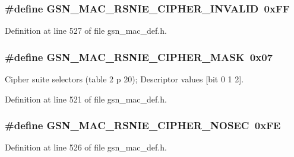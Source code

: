 \hypertarget{a00642_ga6498ff5acf21d809adebf490aaeb1158}{
\subsubsection[{GSN\_\-MAC\_\-RSNIE\_\-CIPHER\_\-INVALID}]{\setlength{\rightskip}{0pt plus 5cm}\#define GSN\_\-MAC\_\-RSNIE\_\-CIPHER\_\-INVALID~0xFF}}
\label{a00642_ga6498ff5acf21d809adebf490aaeb1158}


Definition at line 527 of file gsn\_\-mac\_\-def.h.

\hypertarget{a00642_ga9f1db3741ca60ee70690fe908f615b05}{
\subsubsection[{GSN\_\-MAC\_\-RSNIE\_\-CIPHER\_\-MASK}]{\setlength{\rightskip}{0pt plus 5cm}\#define GSN\_\-MAC\_\-RSNIE\_\-CIPHER\_\-MASK~0x07}}
\label{a00642_ga9f1db3741ca60ee70690fe908f615b05}


Cipher suite selectors (table 2 p 20); Descriptor values \mbox{[}bit 0 1 2\mbox{]}. 



Definition at line 521 of file gsn\_\-mac\_\-def.h.

\hypertarget{a00642_ga29ef5d37177a52a22dd6707dd3e943cf}{
\subsubsection[{GSN\_\-MAC\_\-RSNIE\_\-CIPHER\_\-NOSEC}]{\setlength{\rightskip}{0pt plus 5cm}\#define GSN\_\-MAC\_\-RSNIE\_\-CIPHER\_\-NOSEC~0xFE}}
\label{a00642_ga29ef5d37177a52a22dd6707dd3e943cf}


Definition at line 526 of file gsn\_\-mac\_\-def.h.

